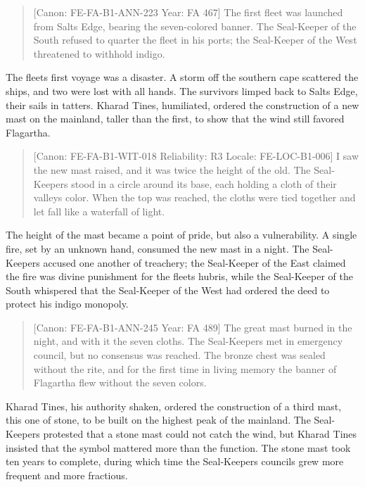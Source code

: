 \begin{quote}
{[}Canon: FE-FA-B1-ANN-223 \textbar{} Year: FA 467{]} The first fleet
was launched from Salt\textquotesingle s Edge, bearing the seven-colored
banner. The Seal-Keeper of the South refused to quarter the fleet in his
ports; the Seal-Keeper of the West threatened to withhold indigo.
\end{quote}

The fleet\textquotesingle s first voyage was a disaster. A storm off the
southern cape scattered the ships, and two were lost with all hands. The
survivors limped back to Salt\textquotesingle s Edge, their sails in
tatters. Kharad Tines, humiliated, ordered the construction of a new
mast on the mainland, taller than the first, to show that the wind still
favored Flagartha.

\begin{quote}
{[}Canon: FE-FA-B1-WIT-018 \textbar{} Reliability: R3 \textbar{} Locale:
FE-LOC-B1-006{]} I saw the new mast raised, and it was twice the height
of the old. The Seal-Keepers stood in a circle around its base, each
holding a cloth of their valley\textquotesingle s color. When the top
was reached, the cloths were tied together and let fall like a waterfall
of light.
\end{quote}

The height of the mast became a point of pride, but also a
vulnerability. A single fire, set by an unknown hand, consumed the new
mast in a night. The Seal-Keepers accused one another of treachery; the
Seal-Keeper of the East claimed the fire was divine punishment for the
fleet\textquotesingle s hubris, while the Seal-Keeper of the South
whispered that the Seal-Keeper of the West had ordered the deed to
protect his indigo monopoly.

\begin{quote}
{[}Canon: FE-FA-B1-ANN-245 \textbar{} Year: FA 489{]} The great mast
burned in the night, and with it the seven cloths. The Seal-Keepers met
in emergency council, but no consensus was reached. The bronze chest was
sealed without the rite, and for the first time in living memory the
banner of Flagartha flew without the seven colors.
\end{quote}

Kharad Tines, his authority shaken, ordered the construction of a third
mast, this one of stone, to be built on the highest peak of the
mainland. The Seal-Keepers protested that a stone mast could not catch
the wind, but Kharad Tines insisted that the symbol mattered more than
the function. The stone mast took ten years to complete, during which
time the Seal-Keepers\textquotesingle{} councils grew more frequent and
more fractious.

